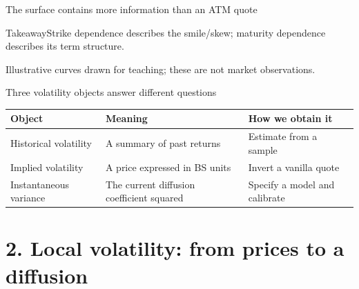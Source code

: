 \documentclass[handout,10pt,t,aspectratio=169]{beamer}
\newenvironment{keybox}{\begin{exampleblock}{Takeaway}}{\end{exampleblock}}
\newcommand{\source}[1]{\vfill{\scriptsize\color{gray}#1\par}}
\begin{document}
\begin{frame}{The surface contains more information than an ATM quote}

    \begin{center}\end{center}
    \begin{keybox}Strike dependence describes the smile/skew; maturity dependence
    describes its term structure.\end{keybox}
    \source{Illustrative curves drawn for teaching; these are not market observations.}
\end{frame}

\begin{frame}{Three volatility objects answer different questions}

    \begin{center}\begin{tabular}{L{.22\textwidth}L{.35\textwidth}L{.31\textwidth}}
    \toprule Object & Meaning & How we obtain it\\\midrule
    Historical volatility & A summary of past returns & Estimate from a sample\\[.6em]
    Implied volatility & A price expressed in BS units & Invert a vanilla quote\\[.6em]
    Instantaneous variance & The current diffusion coefficient squared & Specify a model and calibrate\\
    \bottomrule\end{tabular}\end{center}
\end{frame}

\section{2. Local volatility: from prices to a diffusion}
\end{document}
